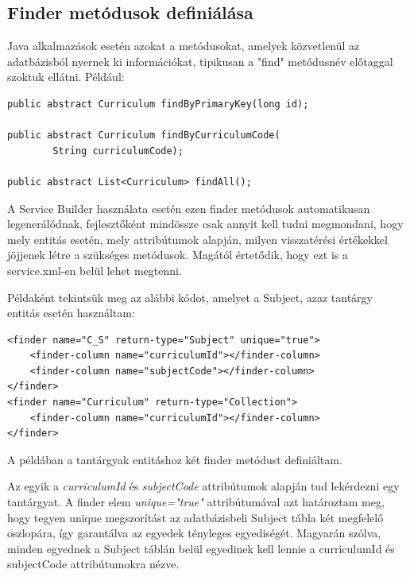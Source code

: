 \documentclass[hidelinks, 12pt, a4paper]{report}
\begin{document}
\subsection{Finder metódusok definiálása}

Java alkalmazások esetén azokat a metódusokat, amelyek közvetlenül az adatbázisból nyernek ki információkat, tipikusan a "find" metódusnév előtaggal szoktuk ellátni. Például:

\begin{minipage}{\linewidth}
\begin{lstlisting}
public abstract Curriculum findByPrimaryKey(long id);

public abstract Curriculum findByCurriculumCode(
		String curriculumCode);

public abstract List<Curriculum> findAll();
\end{lstlisting}
\end{minipage}

A Service Builder használata esetén ezen finder metódusok automatikusan legenerálódnak, fejlesztőként mindössze csak annyit kell tudni megmondani, hogy mely entitás esetén, mely attribútumok alapján, milyen visszatérési értékekkel jöjjenek létre a szükséges metódusok. Magától értetődik, hogy ezt is a service.xml-en belül lehet megtenni.

Példaként tekintsük meg az alábbi kódot, amelyet a Subject, azaz tantárgy entitás esetén használtam:

\begin{minipage}{\linewidth}
\begin{lstlisting}
<finder name="C_S" return-type="Subject" unique="true">
	<finder-column name="curriculumId"></finder-column>
	<finder-column name="subjectCode"></finder-column>
</finder>
<finder name="Curriculum" return-type="Collection">
	<finder-column name="curriculumId"></finder-column>
</finder>
\end{lstlisting}
\end{minipage}

A példában a tantárgyak entitáshoz két finder metódust definiáltam.

Az egyik a \emph{curriculumId} és \emph{subjectCode} attribútumok alapján tud lekérdezni egy tantárgyat. A finder elem \emph{unique="true"} attribútumával azt határoztam meg, hogy tegyen unique megszorítást az adatbázisbeli Subject tábla két megfelelő oszlopára, így garantálva az egyedek tényleges egyediségét. Magyarán szólva, minden egyednek a Subject táblán belül egyedinek kell lennie a curriculumId és subjectCode attribútumokra nézve.
\end{document}
